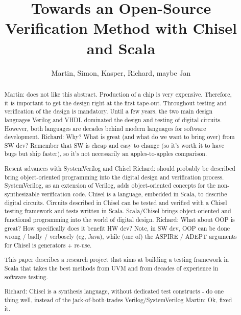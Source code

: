\documentclass[a4paper, conference]{IEEEtran}
\newcommand{\martin}[1]{{\color{blue} Martin: #1}}
\newcommand{\ducky}[1]{{\color{orange} Richard: #1}}
\begin{document}

\title{Towards an Open-Source Verification Method with
Chisel and Scala}

\author{Martin, Simon, Kasper, Richard, maybe Jan}




\maketitle \thispagestyle{empty}

\begin{abstract}
\martin{does not like this abstract.}
Production of a chip is very expensive. Therefore, it is important to get the design right
at the first tape-out. Throughout testing and verification of the design is mandatory.
Until a few years, the two main design languages Verilog and VHDL dominated the
design and testing of digital circuits. However, both languages are decades behind
modern languages for software development. \ducky{Why? What is great (and what do we want to bring over) from SW dev? Remember that SW is cheap and easy to change (so it's worth it to have bugs but ship faster), so it's not necessarily an apples-to-apples comparison.}

Resent advances with SystemVerilog and Chisel \ducky{should probably be described} bring object-oriented programming
into the digital design and verification process. SystemVerilog, as an extension of Verilog,
adds object-oriented concepts for the non-synthesizable verification code.
Chisel is a language, embedded in Scala, to describe digital circuits.
Circuits described in Chisel can be tested and verified with a Chisel testing
framework and tests written in Scala.
Scala/Chisel brings object-oriented and functional programming into the world of
digital design. \ducky{What about OOP is great? How specifically does it benefit HW dev? Note, in SW dev, OOP can be done wrong / badly / verbosely (eg, Java), while (one of) the ASPIRE / ADEPT arguments for Chisel is generators + re-use.}

This paper describes a research project that aims at building a testing framework
in Scala that takes the best methods from UVM and from decades of experience
in software testing.

\ducky{Chisel is a synthesis language, without dedicated test constructs - do one thing well, instead of the jack-of-both-trades Verilog/SystemVerilog}
\martin{Ok, fixed it.}
\end{abstract}
\end{document}
